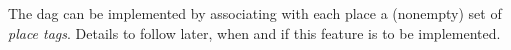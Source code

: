 The dag can be implemented by associating with each place a (nonempty)
set of {\em place tags}. Details to follow later, when and if this
feature is to be implemented.
